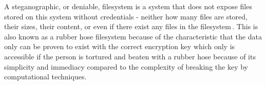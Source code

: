 A steganographic, or deniable, filesystem is a system that does not expose files stored on this system without credentials - neither how many files are stored, their sizes, their content, or even if there exist any files in the filesystem\,\cite{andersonSteganographicFileSystem1998}. This is also known as a rubber hose filesystem because of the characteristic that the data only can be proven to exist with the correct encryption key which only is accessible if the person is tortured and beaten with a rubber hose because of its simplicity and immediacy compared to the complexity of breaking the key by computational techniques.

